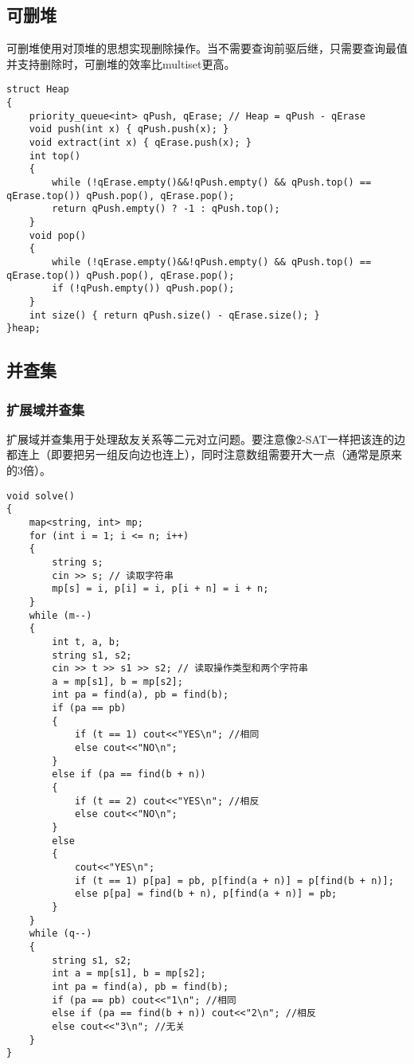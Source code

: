 \documentclass[a4paper,fontset=none]{ctexart}
\begin{document}
\subsection{可删堆}

可删堆使用对顶堆的思想实现删除操作。当不需要查询前驱后继，只需要查询最值并支持删除时，可删堆的效率比multiset更高。
\begin{verbatim}
struct Heap
{
    priority_queue<int> qPush, qErase; // Heap = qPush - qErase
    void push(int x) { qPush.push(x); }
    void extract(int x) { qErase.push(x); }
    int top()
    {
        while (!qErase.empty()&&!qPush.empty() && qPush.top() == qErase.top()) qPush.pop(), qErase.pop();
        return qPush.empty() ? -1 : qPush.top();
    }
    void pop()
    {
        while (!qErase.empty()&&!qPush.empty() && qPush.top() == qErase.top()) qPush.pop(), qErase.pop();
        if (!qPush.empty()) qPush.pop();
    }
    int size() { return qPush.size() - qErase.size(); }
}heap;
\end{verbatim}
\subsection{并查集}
\subsubsection{扩展域并查集}
扩展域并查集用于处理敌友关系等二元对立问题。要注意像2-SAT一样把该连的边都连上（即要把另一组反向边也连上），同时注意数组需要开大一点（通常是原来的3倍）。
\begin{verbatim}
void solve()
{
    map<string, int> mp;
    for (int i = 1; i <= n; i++)
    {
        string s;
        cin >> s; // 读取字符串
        mp[s] = i, p[i] = i, p[i + n] = i + n;
    }
    while (m--)
    {
        int t, a, b;
        string s1, s2;
        cin >> t >> s1 >> s2; // 读取操作类型和两个字符串
        a = mp[s1], b = mp[s2];
        int pa = find(a), pb = find(b);
        if (pa == pb)
        {
            if (t == 1) cout<<"YES\n"; //相同
            else cout<<"NO\n";
        }
        else if (pa == find(b + n))
        {
            if (t == 2) cout<<"YES\n"; //相反
            else cout<<"NO\n";
        }
        else
        {
            cout<<"YES\n";
            if (t == 1) p[pa] = pb, p[find(a + n)] = p[find(b + n)];
            else p[pa] = find(b + n), p[find(a + n)] = pb;
        }
    }
    while (q--)
    {
        string s1, s2;
        int a = mp[s1], b = mp[s2];
        int pa = find(a), pb = find(b);
        if (pa == pb) cout<<"1\n"; //相同
        else if (pa == find(b + n)) cout<<"2\n"; //相反
        else cout<<"3\n"; //无关
    }
}
\end{verbatim}
\end{document}
